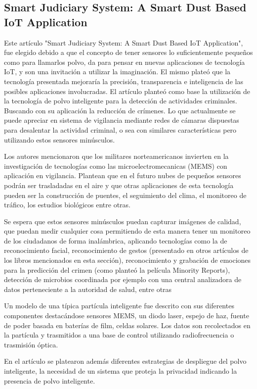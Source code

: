 \subsection{Smart Judiciary System: A Smart Dust
            Based IoT Application
}

Este artículo "Smart Judiciary System: A Smart Dust
Based IoT Application"\cite[pág.128]{somaniEmerging2019}, fue elegido debido a que el concepto de tener sensores lo suficientemente pequeños como para llamarlos polvo, da para pensar en nuevas aplicaciones de tecnología IoT, y son una invitación a utilizar la imaginación.
El mismo plateó que la tecnología presentada mejoraría la precisión, transparencia e inteligencia de las posibles aplicaciones involucradas.
El artículo planteó como base la utilización de la tecnología de polvo inteligente para la detección de actividades criminales.
Buscando con su aplicación la reducción de crímenes. Lo que actualmente se puede apreciar en sistema de vigilancia mediante redes de cámaras dispuestas
para desalentar la actividad criminal, o sea con similares características pero utilizando estos sensores minúsculos.\par

Los autores mencionaron que los militares norteamericanos invierten en la investigación de tecnologías como las microelectromecanicas (MEMS) con aplicación en vigilancia. Plantean que en el futuro nubes de pequeños sensores podrán ser trasladadas en el aire y que otras aplicaciones de esta tecnología pueden ser la construcción de puentes, el seguimiento del clima, el monitoreo de tráfico, los estudios biológicos entre otras.\par

Se espera que estos sensores minúsculos puedan capturar imágenes de calidad, que puedan medir cualquier cosa permitiendo de esta manera tener un monitoreo de los ciudadanos de forma inalámbrica, aplicando tecnologías como la de reconocimiento facial, reconocimiento de gestos (presentado en otros artículos de los libros mencionados en esta sección), reconocimiento y grabación de emociones para la predicción del crimen (como planteó la película Minority Reports), detección de microbios coordinada por ejemplo con una central analizadora de datos perteneciente a la autoridad de salud, entre otras\par

Un modelo de una típica partícula inteligente fue descrito con sus diferentes componentes destacándose sensores MEMS, un diodo laser, espejo de haz, fuente de poder basada en baterías de film, celdas solares. Los datos son recolectados en  la partícula y trasmitidos a una base de control utilizando radiofrecuencia o trasmisión óptica.\par

En el artículo se platearon además diferentes estrategias de despliegue del polvo inteligente, la necesidad de un sistema que proteja la privacidad indicando la presencia de polvo inteligente.\par

